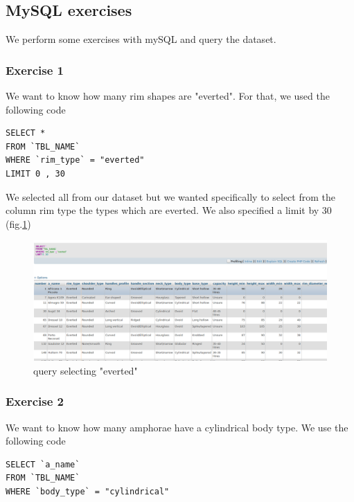 \documentclass[10pt,a4paper]{article}
\begin{document}
\subsection{MySQL exercises}

We perform some exercises with mySQL and query the dataset. 

\subsubsection{Exercise 1}

We want to know how many rim shapes are "everted". For that, we used the following code

\begin{verbatim}
SELECT *
FROM `TBL_NAME`
WHERE `rim_type` = "everted"
LIMIT 0 , 30
\end{verbatim}


We selected all from our dataset but we wanted specifically to select from the column rim type the types which are everted. We also specified a limit by 30 (fig.\ref{query1})

\begin{figure}[htp]
     \centering
\includegraphics[scale=0.30]{output_query1.png}
\caption{query selecting "everted"}
\label{query1}

\end{figure} 



\subsubsection{Exercise 2}

We want to know how many amphorae have a cylindrical body type. We use the following code

\begin{verbatim}
SELECT `a_name`
FROM `TBL_NAME`
WHERE `body_type` = "cylindrical"
\end{verbatim}
\end{document}
